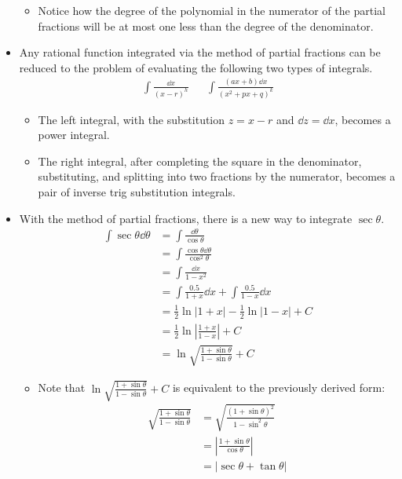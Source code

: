 \documentclass[../main.tex]{subfiles}
\begin{document}
\begin{itemize}
\begin{itemize}
    \item Notice how the degree of the polynomial in the numerator of the partial fractions will be at most one less than the degree of the denominator.
    \end{itemize}
    \item Any rational function integrated via the method of partial fractions can be reduced to the problem of evaluating the following two types of integrals.
    \begin{align*}
        \int\frac{\dd x}{(x-r)^h}&&
        \int\frac{(ax+b)\dd{x}}{\left( x^2+px+q \right)^k}
    \end{align*}
    \begin{itemize}
        \item The left integral, with the substitution $z=x-r$ and $\dd{z}=\dd{x}$, becomes a power integral.
        \item The right integral, after completing the square in the denominator, substituting, and splitting into two fractions by the numerator, becomes a pair of inverse trig substitution integrals.
    \end{itemize}
    \item With the method of partial fractions, there is a new way to integrate $\sec\theta$.
    \begin{align*}
        \int\sec\theta\dd{\theta} &= \int\frac{\dd\theta}{\cos\theta}\\
        &= \int\frac{\cos\theta\dd{\theta}}{\cos^2\theta}\\
        &= \int\frac{\dd x}{1-x^2}\\
        &= \int\frac{0.5}{1+x}\dd{x}+\int\frac{0.5}{1-x}\dd{x}\\
        &= \frac{1}{2}\ln|1+x|-\frac{1}{2}\ln|1-x|+C\\
        &= \frac{1}{2}\ln\left| \frac{1+x}{1-x} \right|+C\\
        &= \ln\sqrt{\frac{1+\sin\theta}{1-\sin\theta}}+C
    \end{align*}
    \begin{itemize}
        \item Note that $\ln\sqrt{\frac{1+\sin\theta}{1-\sin\theta}}+C$ is equivalent to the previously derived form:
        \begin{align*}
            \sqrt{\frac{1+\sin\theta}{1-\sin\theta}} &= \sqrt{\frac{(1+\sin\theta)^2}{1-\sin^2\theta}}\\
            &= \left| \frac{1+\sin\theta}{\cos\theta} \right|\\
            &= |\sec\theta+\tan\theta|
        \end{align*}
    \end{itemize}
\end{itemize}
\end{document}

